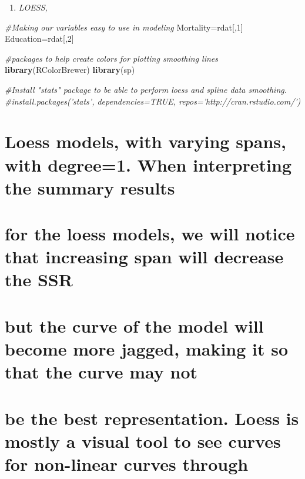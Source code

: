 \documentclass[]{article}
\newenvironment{Shaded}{\begin{snugshade}}{\end{snugshade}}
\newcommand{\KeywordTok}[1]{\textcolor[rgb]{0.13,0.29,0.53}{\textbf{#1}}}
\newcommand{\DecValTok}[1]{\textcolor[rgb]{0.00,0.00,0.81}{#1}}
\newcommand{\CommentTok}[1]{\textcolor[rgb]{0.56,0.35,0.01}{\textit{#1}}}
\newcommand{\NormalTok}[1]{#1}
\providecommand{\tightlist}{%
  \setlength{\itemsep}{0pt}\setlength{\parskip}{0pt}}
\begin{document}
\begin{enumerate}
\def\labelenumi{\arabic{enumi})}
\setcounter{enumi}{2}
\tightlist
\item
  \emph{LOESS,}
\end{enumerate}

\begin{Shaded}
\begin{Highlighting}[]
\CommentTok{#Making our variables easy to use in modeling}
\NormalTok{Mortality=rdat[,}\DecValTok{1}\NormalTok{]}
\NormalTok{Education=rdat[,}\DecValTok{2}\NormalTok{]}

\CommentTok{#packages to help create colors for plotting smoothing lines}
\KeywordTok{library}\NormalTok{(RColorBrewer)}
\KeywordTok{library}\NormalTok{(sp)}

\CommentTok{#Install "stats" package to be able to perform loess and spline data smoothing.}
\CommentTok{#install.packages('stats', dependencies=TRUE, repos='http://cran.rstudio.com/')}
\end{Highlighting}
\end{Shaded}

\section{Loess models, with varying spans, with degree=1. When
interpreting the summary
results}\label{loess-models-with-varying-spans-with-degree1.-when-interpreting-the-summary-results}

\section{for the loess models, we will notice that increasing span will
decrease the
SSR}\label{for-the-loess-models-we-will-notice-that-increasing-span-will-decrease-the-ssr}

\section{but the curve of the model will become more jagged, making it
so that the curve may
not}\label{but-the-curve-of-the-model-will-become-more-jagged-making-it-so-that-the-curve-may-not}

\section{be the best representation. Loess is mostly a visual tool to
see curves for non-linear curves
through}\label{be-the-best-representation.-loess-is-mostly-a-visual-tool-to-see-curves-for-non-linear-curves-through}
\end{document}
